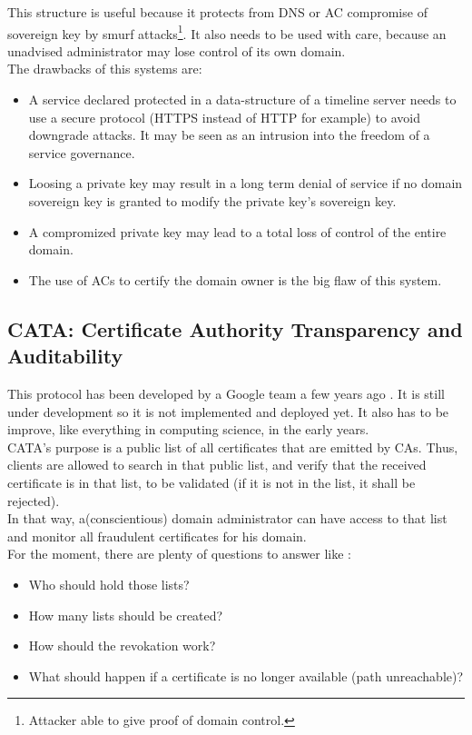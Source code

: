 \documentclass[journal, a4paper]{IEEEtran}
\begin{document}
This structure is useful because it protects from DNS or AC compromise of sovereign key by smurf attacks\footnote{Attacker able to give proof of domain control.}. It also needs to be used with care, because an unadvised administrator may lose control of its own domain.\\

The drawbacks of this systems are:
\begin{itemize}
	\item A service declared protected in a data-structure of a timeline server needs to use a secure protocol (HTTPS instead of HTTP for example) to avoid downgrade attacks. It may be seen as an intrusion into the freedom of a service governance.
	\item Loosing a private key may result in a long term denial of service if no domain sovereign key is granted to modify the private key's sovereign key.
	\item A compromized private key may lead to a total loss of control of the entire domain.
	\item The use of ACs to certify the domain owner is the big flaw of this system.
\end{itemize}

\subsection{CATA: Certificate Authority Transparency and Auditability}
\label{certtrans}

This protocol has been developed by a Google team a few years ago \cite{LL11}. It is still under development \cite{certtransp2013} so it is not implemented and deployed yet. It also has to be improve, like everything in computing science, in the early years.\\
CATA's purpose is a public list of all certificates that are emitted by CAs. Thus, clients are allowed to search in that public list, and verify that the received certificate is in that list, to be validated (if it is not in the list, it shall be rejected).\\
In that way, a(conscientious) domain administrator can have access to that list and monitor all fraudulent certificates for his domain.\\
For the moment, there are plenty of questions to answer like :
\begin{itemize}
	\item Who should hold those lists?
	\item How many lists should be created?
	\item How should the revokation work?
	\item What should happen if a certificate is no longer available (path unreachable)?
\end{itemize}
\end{document}
